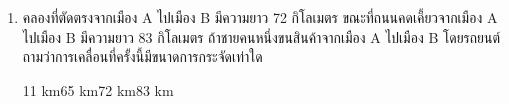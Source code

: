 \begin{enumerate}
	\item   \nonet  คลองที่ตัดตรงจากเมือง  A  ไปเมือง  B  มีความยาว  72  กิโลเมตร  ขณะที่ถนนคดเคี้ยวจากเมือง  A  ไปเมือง  B  มีความยาว  83  กิโลเมตร  ถ้าชายคนหนึ่งขนสินค้าจากเมือง  A  ไปเมือง  B  โดยรถยนต์  ถามว่าการเคลื่อนที่ครั้งนี้มีขนาดการกระจัดเท่าใด \runningj
	\begin{4c}
		{11 km}{65 km}{72 km}{83 km}
	\end{4c}
\end{enumerate}
